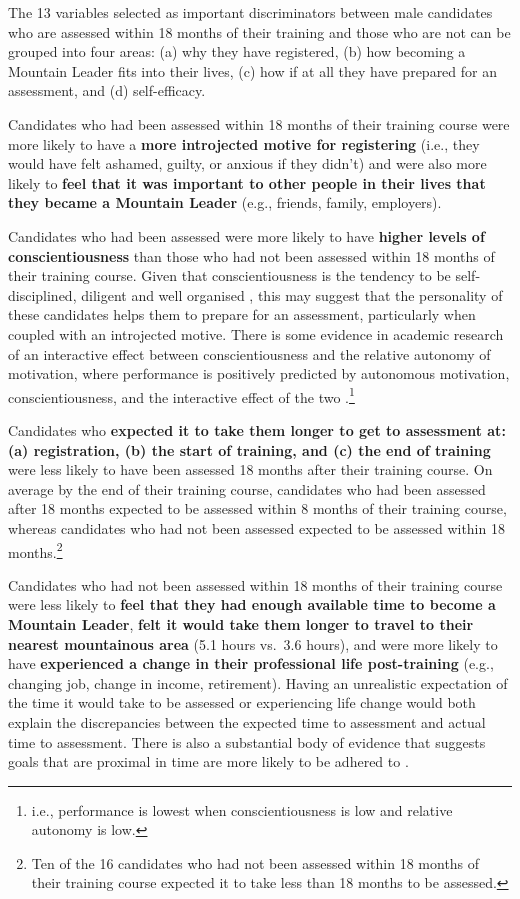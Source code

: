 \documentclass[
  12pt,
  a4paper,
]{book}
\begin{document}
The 13 variables selected as important discriminators between male candidates who are assessed within 18 months of their training and those who are not can be grouped into four areas: (a) why they have registered, (b) how becoming a Mountain Leader fits into their lives, (c) how if at all they have prepared for an assessment, and (d) self-efficacy.

Candidates who had been assessed within 18 months of their training course were more likely to have a \textbf{more introjected motive for registering} (i.e., they would have felt ashamed, guilty, or anxious if they didn't) and were also more likely to \textbf{feel that it was important to other people in their lives that they became a Mountain Leader} (e.g., friends, family, employers).

Candidates who had been assessed were more likely to have \textbf{higher levels of conscientiousness} than those who had not been assessed within 18 months of their training course. Given that conscientiousness is the tendency to be self-disciplined, diligent and well organised \citep{Costa1992}, this may suggest that the personality of these candidates helps them to prepare for an assessment, particularly when coupled with an introjected motive. There is some evidence in academic research of an interactive effect between conscientiousness and the relative autonomy of motivation, where performance is positively predicted by autonomous motivation, conscientiousness, and the interactive effect of the two \citep{DiDomenico2015, Zhou2015}.\footnote{i.e., performance is lowest when conscientiousness is low and relative autonomy is low.}

Candidates who \textbf{expected it to take them longer to get to assessment at: (a) registration, (b) the start of training, and (c) the end of training} were less likely to have been assessed 18 months after their training course. On average by the end of their training course, candidates who had been assessed after 18 months expected to be assessed within 8 months of their training course, whereas candidates who had not been assessed expected to be assessed within 18 months.\footnote{Ten of the 16 candidates who had not been assessed within 18 months of their training course expected it to take less than 18 months to be assessed.}

Candidates who had not been assessed within 18 months of their training course were less likely to \textbf{feel that they had enough available time to become a Mountain Leader}, \textbf{felt it would take them longer to travel to their nearest mountainous area} (5.1 hours vs.~3.6 hours), and were more likely to have \textbf{experienced a change in their professional life post-training} (e.g., changing job, change in income, retirement). Having an unrealistic expectation of the time it would take to be assessed or experiencing life change would both explain the discrepancies between the expected time to assessment and actual time to assessment. There is also a substantial body of evidence that suggests goals that are proximal in time are more likely to be adhered to \citep{Hardy1996, Weinberg2014}.
\end{document}
